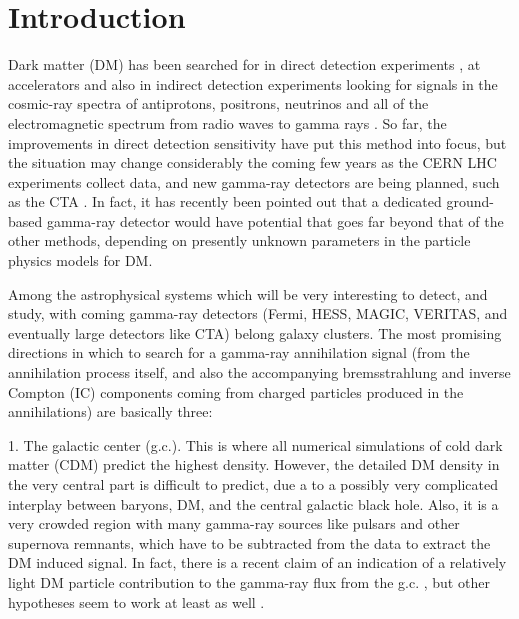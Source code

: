 \documentclass[10pt,aps,pra,reprint,amsmath,amsfonts,amssymb,showpacs,nofootinbib,floatfix]{revtex4-1}
\begin{document}
\maketitle
\section{Introduction}

Dark matter (DM) has been searched for in direct detection experiments
\cite{Pato:2010zk}, at accelerators
\cite{Ellis:2001hv,Baer:2006ff,Khachatryan:2011tk} and also in
indirect detection experiments looking for signals in the cosmic-ray
spectra of antiprotons, positrons, neutrinos and all of the
electromagnetic spectrum from radio waves to gamma rays
\cite{Bergstrom:2009ib}. So far, the improvements in direct detection
sensitivity have put this method into focus, but the situation may
change considerably the coming few years as the CERN LHC experiments
collect data, and new gamma-ray detectors are being planned, such as
the CTA \cite{Consortium:2010bc}. In fact, it has recently been
pointed out \cite{Bergstrom:2010gh} that a dedicated ground-based
gamma-ray detector would have potential that goes far beyond that of
the other methods, depending on presently unknown parameters in the
particle physics models for DM.


Among the astrophysical systems which will be very interesting to
detect, and study, with coming gamma-ray detectors (Fermi, HESS,
MAGIC, VERITAS, and eventually large detectors like CTA) belong galaxy
clusters. The most promising directions in which to search for a
gamma-ray annihilation signal (from the annihilation process itself,
and also the accompanying bremsstrahlung and inverse Compton (IC)
components coming from charged particles produced in the annihilations)
are basically three:

1. The galactic center (g.c.). This is where all numerical simulations
of cold dark matter (CDM) predict the highest density. However, the
detailed DM density in the very central part is difficult to predict,
due a to a possibly very complicated interplay between baryons, DM,
and the central galactic black hole. Also, it is a very crowded region
with many gamma-ray sources like pulsars and other supernova remnants,
which have to be subtracted from the data to extract the DM induced
signal. In fact, there is a recent claim of an indication of a
relatively light DM particle contribution to the gamma-ray flux from
the g.c. \cite{2010arXiv1010.2752H}, but other hypotheses seem to work
at least as well \cite{2010arXiv1012.5839B}.
\end{document}
